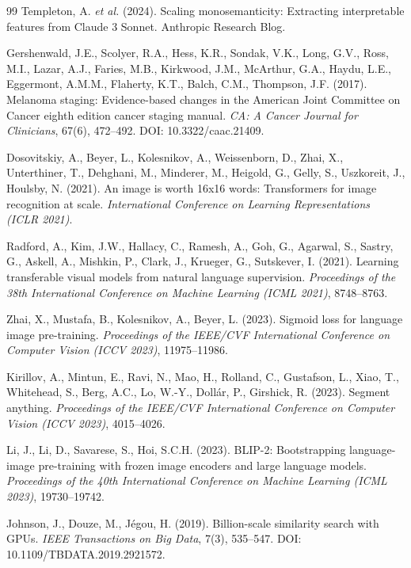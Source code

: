 \begin{thebibliography}{99}
Templeton, A. \emph{et al.} (2024). Scaling monosemanticity: Extracting interpretable features from Claude 3 Sonnet. Anthropic Research Blog.

Gershenwald, J.E., Scolyer, R.A., Hess, K.R., Sondak, V.K., Long, G.V., Ross, M.I., Lazar, A.J., Faries, M.B., Kirkwood, J.M., McArthur, G.A., Haydu, L.E., Eggermont, A.M.M., Flaherty, K.T., Balch, C.M., Thompson, J.F. (2017). Melanoma staging: Evidence-based changes in the American Joint Committee on Cancer eighth edition cancer staging manual. \emph{CA: A Cancer Journal for Clinicians}, 67(6), 472--492. DOI: 10.3322/caac.21409.

Dosovitskiy, A., Beyer, L., Kolesnikov, A., Weissenborn, D., Zhai, X., Unterthiner, T., Dehghani, M., Minderer, M., Heigold, G., Gelly, S., Uszkoreit, J., Houlsby, N. (2021). An image is worth 16x16 words: Transformers for image recognition at scale. \emph{International Conference on Learning Representations (ICLR 2021)}.

Radford, A., Kim, J.W., Hallacy, C., Ramesh, A., Goh, G., Agarwal, S., Sastry, G., Askell, A., Mishkin, P., Clark, J., Krueger, G., Sutskever, I. (2021). Learning transferable visual models from natural language supervision. \emph{Proceedings of the 38th International Conference on Machine Learning (ICML 2021)}, 8748--8763.

Zhai, X., Mustafa, B., Kolesnikov, A., Beyer, L. (2023). Sigmoid loss for language image pre-training. \emph{Proceedings of the IEEE/CVF International Conference on Computer Vision (ICCV 2023)}, 11975--11986.

Kirillov, A., Mintun, E., Ravi, N., Mao, H., Rolland, C., Gustafson, L., Xiao, T., Whitehead, S., Berg, A.C., Lo, W.-Y., Dollár, P., Girshick, R. (2023). Segment anything. \emph{Proceedings of the IEEE/CVF International Conference on Computer Vision (ICCV 2023)}, 4015--4026.

Li, J., Li, D., Savarese, S., Hoi, S.C.H. (2023). BLIP-2: Bootstrapping language-image pre-training with frozen image encoders and large language models. \emph{Proceedings of the 40th International Conference on Machine Learning (ICML 2023)}, 19730--19742.

Johnson, J., Douze, M., Jégou, H. (2019). Billion-scale similarity search with GPUs. \emph{IEEE Transactions on Big Data}, 7(3), 535--547. DOI: 10.1109/TBDATA.2019.2921572.


\end{thebibliography}
